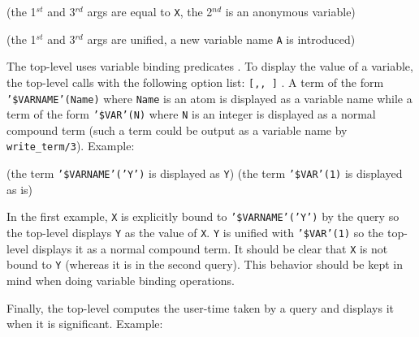 \begin{CodeTwoCols}
\SkipLine
{} {(the 1$^{st}$ and 3$^{rd}$ args are equal to \texttt{X},
the 2$^{nd}$ is an anonymous variable)}
\end{CodeTwoCols}

\begin{CodeTwoCols}
\SkipLine
{} {(the 1$^{st}$ and 3$^{rd}$ args are unified, a new
variable name \texttt{A} is introduced)}
\end{CodeTwoCols}

The top-level uses variable binding predicates . To display the value of a variable, the top-level calls
 with the following option list:
\texttt{[,,
]} . A term of the
form \texttt{'\$VARNAME'(Name)} where \texttt{Name} is an atom is displayed
as a variable name while a term of the form \texttt{'\$VAR'(N)} where
\texttt{N} is an integer is displayed as a normal compound term (such a term
could be output as a variable name by \texttt{write\_term/3}). Example:

\begin{CodeTwoCols}
\SkipLine
{} {(the term \texttt{'\$VARNAME'('Y')} is displayed as \texttt{Y})}
 {(the term \texttt{'\$VAR'(1)} is displayed as is)}
\end{CodeTwoCols}

\begin{CodeTwoCols}
\SkipLine
{}
\end{CodeTwoCols}

In the first example, \texttt{X} is explicitly bound to
\texttt{'\$VARNAME'('Y')} by the query so the top-level displays \texttt{Y}
as the value of \texttt{X}. \texttt{Y} is unified with \texttt{'\$VAR'(1)} so
the top-level displays it as a normal compound term. It should be clear that
\texttt{X} is not bound to \texttt{Y} (whereas it is in the second
query). This behavior should be kept in mind when doing variable binding
operations.

Finally, the top-level computes the user-time  taken
by a query and displays it when it is significant. Example:

\begin{CodeTwoCols}
\SkipLine
{}
\SkipLine
{}
\end{CodeTwoCols}

